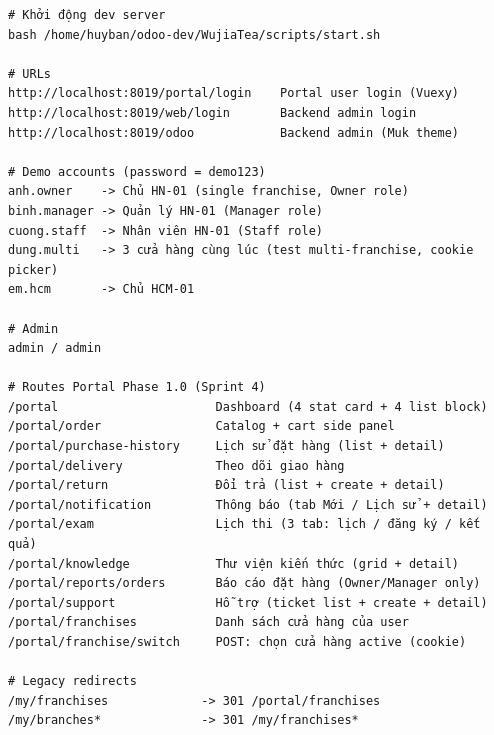 \begin{lstlisting}[style=shell]
# Khởi động dev server
bash /home/huyban/odoo-dev/WujiaTea/scripts/start.sh

# URLs
http://localhost:8019/portal/login    Portal user login (Vuexy)
http://localhost:8019/web/login       Backend admin login
http://localhost:8019/odoo            Backend admin (Muk theme)

# Demo accounts (password = demo123)
anh.owner    -> Chủ HN-01 (single franchise, Owner role)
binh.manager -> Quản lý HN-01 (Manager role)
cuong.staff  -> Nhân viên HN-01 (Staff role)
dung.multi   -> 3 cửa hàng cùng lúc (test multi-franchise, cookie picker)
em.hcm       -> Chủ HCM-01

# Admin
admin / admin

# Routes Portal Phase 1.0 (Sprint 4)
/portal                      Dashboard (4 stat card + 4 list block)
/portal/order                Catalog + cart side panel
/portal/purchase-history     Lịch sử đặt hàng (list + detail)
/portal/delivery             Theo dõi giao hàng
/portal/return               Đổi trả (list + create + detail)
/portal/notification         Thông báo (tab Mới / Lịch sử + detail)
/portal/exam                 Lịch thi (3 tab: lịch / đăng ký / kết quả)
/portal/knowledge            Thư viện kiến thức (grid + detail)
/portal/reports/orders       Báo cáo đặt hàng (Owner/Manager only)
/portal/support              Hỗ trợ (ticket list + create + detail)
/portal/franchises           Danh sách cửa hàng của user
/portal/franchise/switch     POST: chọn cửa hàng active (cookie)

# Legacy redirects
/my/franchises             -> 301 /portal/franchises
/my/branches*              -> 301 /my/franchises*
\end{lstlisting}

